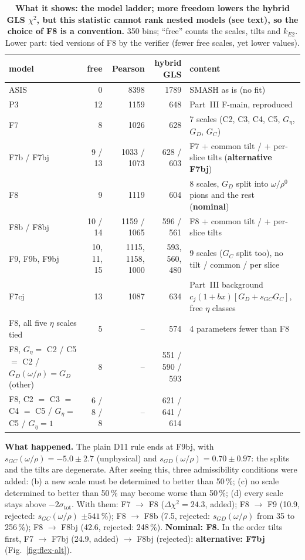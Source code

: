 \documentclass[11pt,a4paper]{article}
\newcommand{\kEtwo}{\ensuremath{k_{E2}}\xspace}
\newcommand{\Geta}{\ensuremath{G_\eta}\xspace}
\begin{document}
\begin{table}[H]
\centering
\caption{\textbf{What it shows: the model ladder; more freedom lowers the hybrid GLS $\chi^2$, but this statistic cannot rank nested models (see
text), so the choice of F8 is a convention.} 350 bins; ``free'' counts the scales, tilts and \kEtwo. Lower part: tied versions of F8 by the
verifier (fewer free scales, yet lower values).}
\label{tab:flex-grid}
\footnotesize
\begin{tabularx}{\textwidth}{@{}>{\raggedright\arraybackslash}p{4.3cm} r r r L@{}}
\toprule
model & free & Pearson & hybrid GLS & content \\
\midrule
ASIS & 0 & 8398 & 1789 & SMASH as is (no fit) \\
P3 & 12 & 1159 & 648 & Part~III F-main, reproduced \\
F7 & 8 & 1026 & 628 & 7 scales (C2, C3, C4, C5, \Geta, $G_D$, $G_C$) \\
F7b / F7bj & 9 / 13 & 1033 / 1073 & 628 / 603 & F7 + common tilt / + per-slice tilts (\textbf{alternative F7bj}) \\
F8 & 9 & 1119 & 604 & 8 scales, $G_D$ split into $\omega/\rho^0$ pions and the rest (\textbf{nominal}) \\
F8b / F8bj & 10 / 14 & 1159 / 1065 & 596 / 561 & F8 + common tilt / + per-slice tilts \\
F9, F9b, F9bj & 10, 11, 15 & 1115, 1158, 1000 & 593, 560, 480 & 9 scales ($G_C$ split too), no tilt / common / per slice \\
F7cj & 13 & 1087 & 634 & Part~III background $c_j(1+bx)[G_D+s_{GC}G_C]$, free $\eta$ classes \\
\midrule
F8, all five $\eta$ scales tied & 5 & -- & 574 & 4 parameters fewer than F8 \\
F8, \Geta $=$ C2 / C5 $=$ C2 / $G_D(\omega/\rho)=G_D$(other) & 8 & -- & 551 / 590 / 593 & \\
F8, C2 $=$ C3 $=$ C4 $=$ C5 / \Geta $=$ C5 / \Geta $=1$ & 6 / 8 / 8 & -- & 621 / 641 / 614 & \\
\bottomrule
\end{tabularx}
\end{table}

\textbf{What happened.} The plain D11 rule ends at F9bj, with $s_{GC}(\omega/\rho)=-5.0\pm2.7$ (unphysical) and $s_{GD}(\omega/\rho)=0.70\pm0.97$:
the splits and the tilts are degenerate. After seeing this, three admissibility conditions were added: (b) a new scale must be determined to better
than 50\,\%; (c) no scale determined to better than 50\,\% may become worse than 50\,\%; (d) every scale stays above $-2\sigma_{\mathrm{tot}}$. With
them: F7 $\to$ F8 ($\Delta\chi^2=24.3$, added); F8 $\to$ F9 (10.9, rejected: $s_{GC}(\omega/\rho)$ $\pm541$\,\%); F8 $\to$ F8b (7.5, rejected:
$s_{GD}(\omega/\rho)$ from 35 to 256\,\%); F8 $\to$ F8bj (42.6, rejected: 248\,\%). \textbf{Nominal: F8.} In the order tilts first, F7 $\to$ F7bj (24.9,
added) $\to$ F8bj (rejected): \textbf{alternative: F7bj} (Fig.~\ref{fig:flex-alt}).
\end{document}

